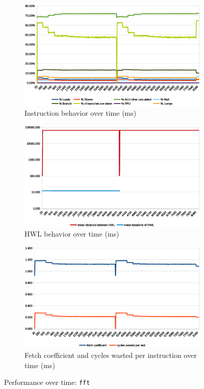 \documentclass[../bachelor_paper.tex]{subfiles}
\begin{document}
\begin{figure}
    \begin{subfigure}{0.45\textwidth}
        \includegraphics[width=\textwidth]{img/graph/mibench/fft_inst.eps}
        \caption{Instruction behavior over time (ms)}
    \end{subfigure}
    \begin{subfigure}{0.45\textwidth}
        \includegraphics[width=\textwidth]{img/graph/mibench/fft_hwl.eps}
        \caption{\ac{HWL} behavior over time (ms)}
    \end{subfigure}
    \begin{subfigure}{0.45\textwidth}
        \includegraphics[width=\textwidth]{img/graph/mibench/fft_fetch_waste.eps}
        \caption{Fetch coefficient and cycles wasted per instruction over time (ms)}
    \end{subfigure}
    \caption{Performance over time: \texttt{fft}}
\end{figure}
\end{document}
